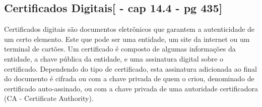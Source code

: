 \documentclass{article}
\begin{document}
		\subsection{Certificados Digitais[\cite{STALLINS} - cap 14.4 - pg 435]}
			\begin{justify}
			
				
					\hspace{2cm}Certificados digitais são documentos eletrônicos que garantem a autenticidade de um certo elemento. Este que pode ser uma entidade, um site da internet ou um terminal de cartões. Um certificado é composto de algumas informações da entidade,  a chave pública da entidade, e uma assinatura digital sobre o certificado. Dependendo do tipo de certificado, esta assinatura adicionada ao final do documento é cifrada ou com a chave privada de quem o criou, denominado de certificado auto-assinado, ou com a chave privada de uma autoridade certificadora (CA - Certificate Authority). \\

			
			\end{justify}

    
\end{document}
